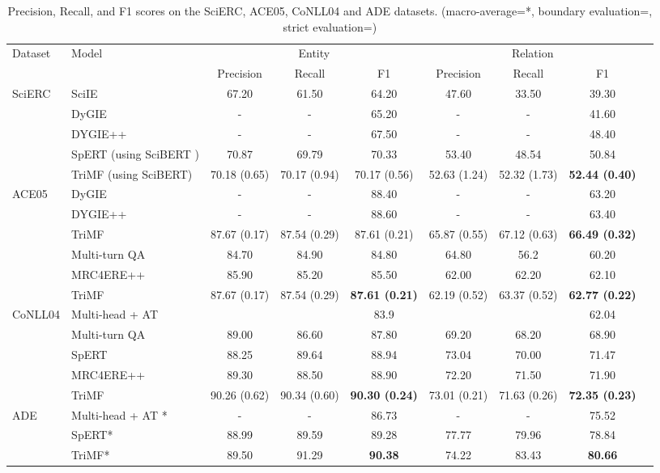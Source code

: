 \documentclass[sigconf]{acmart}
\begin{document}
\begin{table*}[]
\small
\begin{tabular}{@{}llccccccc@{}}
\toprule
  \multirow{2}{*}{Dataset} & \multirow{2}{*}{Model}  & \multicolumn{3}{c}{Entity} & \multicolumn{3}{c}{Relation} \\ 
 \cmidrule(lr){3-5} \cmidrule(lr){6-8}
  &  & Precision & Recall & F1 & Precision & Recall & F1 \\ \midrule
 \multirow{5}{*}{SciERC} & SciIE & 67.20 & 61.50 & 64.20 & 47.60 & 33.50 & 39.30  \\
  & DyGIE & - & - & 65.20 & - & - & 41.60 \\
  & DYGIE++ & - & - & 67.50 & - & - & 48.40  \\
  & SpERT (using SciBERT  \cite{beltagy2019scibert}) & 70.87 & 69.79 & 70.33 & 53.40 & 48.54 & 50.84  \\
  & TriMF (using SciBERT) & 70.18 (0.65) & 70.17 (0.94) & 70.17 (0.56) & 52.63 (1.24) & 52.32 (1.73) & \textbf{52.44 (0.40)}   \\\midrule \multirow{6}{*}{ACE05} & DyGIE & - & - & 88.40 & - & - & 63.20 \\
  & DYGIE++ & - & - & 88.60 & - & - & 63.40 \\
& TriMF  &87.67 (0.17) & 87.54 (0.29) & 87.61 (0.21) & 65.87 (0.55) & 67.12 (0.63)& \textbf{66.49 (0.32)} \\ \cmidrule(lr){2-8} 
  & Multi-turn QA & 84.70 & 84.90 & 84.80 & 64.80 & 56.2 & 60.20 \\
  & MRC4ERE++ & 85.90 & 85.20 & 85.50 & 62.00 & 62.20 & 62.10 \\
   & TriMF &87.67 (0.17) & 87.54 (0.29) & \textbf{87.61 (0.21)}  & 62.19 (0.52) & 63.37 (0.52) & \textbf{62.77 (0.22)} \\ \midrule  \multirow{5}{*}{CoNLL04} & Multi-head + AT  \cite{bekoulis2018adversarial}  &  &  &  83.9 &  &  & 62.04 \\
  & Multi-turn QA & 89.00 & 86.60 & 87.80 & 69.20 & 68.20 & 68.90 \\
& SpERT & 88.25 & 89.64 & 88.94 & 73.04 & 70.00 & 71.47 \\
  & MRC4ERE++ & 89.30 & 88.50 & 88.90 & 72.20 & 71.50 & 71.90 \\
  & TriMF & 90.26 (0.62) & 90.34 (0.60) & \textbf{90.30 (0.24)} & 73.01 (0.21) & 71.63 (0.26) & \textbf{72.35 (0.23)} \\ \midrule \multirow{3}{*}{ADE}& Multi-head + AT  \cite{bekoulis2018adversarial} * & - & - & 86.73 & - & - & 75.52 \\
  & SpERT* & 88.99 & 89.59 & 89.28 & 77.77 & 79.96 & 78.84 \\
  & TriMF* & 89.50 & 91.29 & \textbf{90.38} & 74.22 & 83.43 & \textbf{80.66} \\ \bottomrule
\end{tabular}
\caption{Precision, Recall, and F1 scores on the SciERC, ACE05, CoNLL04 and ADE datasets. (macro-average=*, boundary evaluation=, strict evaluation=)}
\label{tab:results}
\end{table*}
\end{document}

